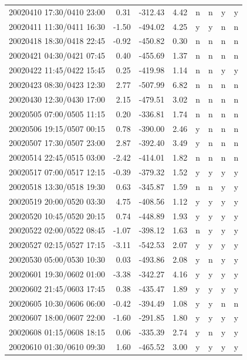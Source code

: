 \documentclass[draft]{agujournal2019}
\begin{document}
\begin{center}
\begin{longtable}{l|rcc|cccc}
20020410 17:30/0410 23:00 & 0.31 & -312.43 & 4.42 & n & n & y & y \\
20020411 11:30/0411 16:30 & -1.50 & -494.02 & 4.25 & y & y & n & n \\
20020418 18:30/0418 22:45 & -0.92 & -450.82 & 0.30 & n & n & n & n \\
20020421 04:30/0421 07:45 & 0.40 & -455.69 & 1.37 & n & n & n & n \\
20020422 11:45/0422 15:45 & 0.25 & -419.98 & 1.14 & n & n & y & y \\
20020423 08:30/0423 12:30 & 2.77 & -507.99 & 6.82 & n & n & n & n \\
20020430 12:30/0430 17:00 & 2.15 & -479.51 & 3.02 & n & n & n & n \\
20020505 07:00/0505 11:15 & 0.20 & -336.81 & 1.74 & n & n & n & n \\
20020506 19:15/0507 00:15 & 0.78 & -390.00 & 2.46 & y & n & n & n \\
20020507 17:30/0507 23:00 & 2.87 & -392.40 & 3.49 & y & n & n & n \\
20020514 22:45/0515 03:00 & -2.42 & -414.01 & 1.82 & n & n & n & n \\
20020517 07:00/0517 12:15 & -0.39 & -379.32 & 1.52 & y & y & y & y \\
20020518 13:30/0518 19:30 & 0.63 & -345.87 & 1.59 & n & n & y & y \\
20020519 20:00/0520 03:30 & 4.75 & -408.56 & 1.12 & y & y & y & y \\
20020520 10:45/0520 20:15 & 0.74 & -448.89 & 1.93 & y & y & y & y \\
20020522 02:00/0522 08:45 & -1.07 & -398.12 & 1.63 & n & y & y & y \\
20020527 02:15/0527 17:15 & -3.11 & -542.53 & 2.07 & y & y & y & y \\
20020530 05:00/0530 10:30 & 0.03 & -493.86 & 2.08 & y & n & y & y \\
20020601 19:30/0602 01:00 & -3.38 & -342.27 & 4.16 & y & y & y & y \\
20020602 21:45/0603 17:45 & 0.38 & -435.47 & 1.89 & y & y & y & y \\
20020605 10:30/0606 06:00 & -0.42 & -394.49 & 1.08 & y & y & n & n \\
20020607 18:00/0607 22:00 & -1.60 & -291.85 & 1.80 & y & y & y & y \\
20020608 01:15/0608 18:15 & 0.06 & -335.39 & 2.74 & y & n & y & y \\
20020610 01:30/0610 09:30 & 1.60 & -465.52 & 3.00 & y & y & y & y \\

\end{longtable}
\end{center}
\end{document}

